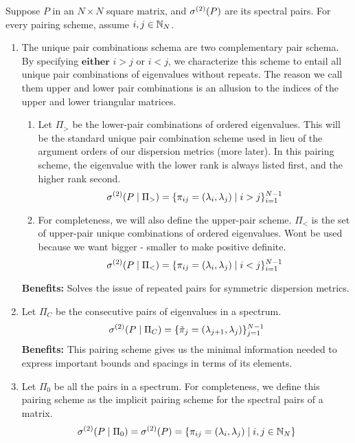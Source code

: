 {}

\noindent Suppose $P$ in an $N \times N$ square matrix, and ${\sigma^{(2)}}(P)$ are its spectral pairs. For every pairing scheme, assume $i,j \in \mathbb{N}_N$.

\begin{enumerate}
  \item The unique pair combinations schema are two complementary pair schema. By specifying $\textbf{either}$ $i > j$ or $i < j$, we characterize this scheme to entail all unique pair combinations of eigenvalues without repeats. The reason we call them upper and lower pair combinations is an allusion to the indices of the upper and lower triangular matrices. \begin{enumerate}
    \item Let $\Pi_>$ be the lower-pair combinations of ordered eigenvalues. This will be the standard unique pair combination scheme used in lieu of the argument orders of our dispersion metrics (more later). In this pairing scheme, the eigenvalue with the lower rank is always listed first, and the higher rank second.
    $${\sigma^{(2)}}(P \mid \Pi_>) = \{\pi_{ij} = (\lambda_i,\lambda_j) \mid i > j\}_{i = 1}^{N-1}$$
    \item For completeness, we will also define the upper-pair scheme. $\Pi_<$ is the set of upper-pair unique combinations of ordered eigenvalues. Wont be used because we want bigger - smaller to make positive definite.
    $${\sigma^{(2)}}(P \mid \Pi_<) = \{\pi_{ij} = (\lambda_i,\lambda_j) \mid i < j\}_{i = 1}^{N-1}$$
  \end{enumerate}
  \textbf{Benefits:} Solves the issue of repeated pairs for symmetric dispersion metrics.
\item Let $\Pi_C$ be the consecutive pairs of eigenvalues in a spectrum.
  $${\sigma^{(2)}}(P \mid \Pi_C) = \{{\tilde{\pi}}_{j} = (\lambda_{j + 1},\lambda_j)\}_{j = 1}^{N-1}$$
  \textbf{Benefits:} This pairing scheme gives us the minimal information needed to express important bounds and spacings in terms of its elements.
  \item Let $\Pi_0$ be all the pairs in a spectrum. For completeness, we define this pairing scheme as the implicit pairing scheme for the spectral pairs of a matrix.
  $${\sigma^{(2)}}(P \mid \Pi_0) = {\sigma^{(2)}}(P) = \{\pi_{ij} = (\lambda_{i},\lambda_j) \mid i,j \in \mathbb{N}_N\}$$
\end{enumerate}

